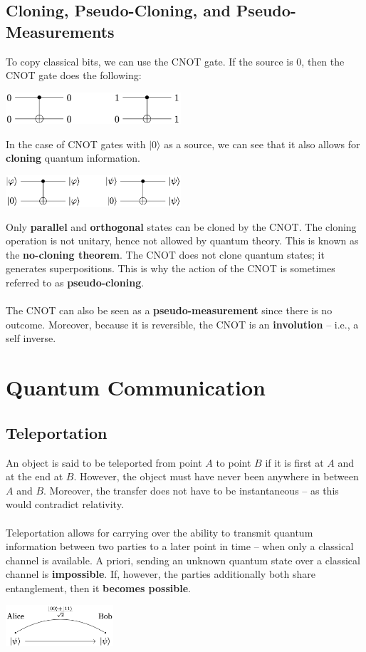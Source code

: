 \documentclass{article}
\begin{document}
\subsection{Cloning, Pseudo-Cloning, and Pseudo-Measurements}
To copy classical bits, we can use the CNOT gate. If the source is 0, then the CNOT gate does the following:
\begin{center}
	\includegraphics[width=6.5cm]{assets/cloning.png}
\end{center}
In the case of CNOT gates with $|0\rangle$ as a source, we can see that it also allows for \textbf{cloning} quantum information.
\begin{center}
	\includegraphics[width=6.5cm]{assets/cloning_2.png}
\end{center}
Only \textbf{parallel} and \textbf{orthogonal} states can be cloned by the CNOT. The cloning operation is not unitary, hence not allowed by quantum theory. This is known as the \textbf{no-cloning theorem}. The CNOT does not clone quantum states; it generates superpositions. This is why the action of the CNOT is sometimes referred to as \textbf{pseudo-cloning}. \\ \\
The CNOT can also be seen as a \textbf{pseudo-measurement} since there is no outcome. Moreover, because it is reversible, the CNOT is an \textbf{involution} -- i.e., a self inverse.

\section{Quantum Communication}
\subsection{Teleportation}
An object is said to be teleported from point $A$ to point $B$ if it is first at $A$ and at the end at $B$. However, the object must have never been anywhere in between $A$ and $B$. Moreover, the transfer does not have to be instantaneous -- as this would contradict relativity. \\ \\
Teleportation allows for carrying over the ability to transmit quantum information between two parties to a later point in time -- when only a classical channel is available. A priori, sending an unknown quantum state over a classical channel is \textbf{impossible}. If, however, the parties additionally both share entanglement, then it \textbf{becomes possible}.
\begin{center}
	\includegraphics[width=4cm]{assets/teleportation.png}
\end{center}
\end{document}
